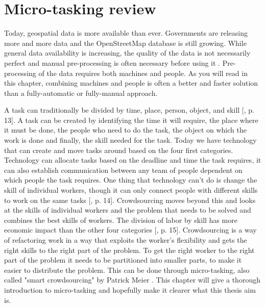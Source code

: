 \chapter{Micro-tasking review}
Today, geospatial data is more available than ever. Governments are releasing more and more data and the OpenStreetMap database is still growing. While general data availability is increasing, the quality of the data is not necessarily perfect and manual pre-processing is often necessary before using it \citep{Difallah2015}.  Pre-processing of the data requires both machines and people. As you will read in this chapter, combining machines and people is often a better and faster solution than a fully-automatic or fully-manual approach. 

A task can traditionally be divided by time, place, person, object, and skill [\citep{Meier2013}, p. 13]. A task can be created by identifying the time it will require, the place where it must be done, the people who need to do the task, the object on which the work is done and finally, the skill needed for the task. Today we have technology that can create and move tasks around based on the four first categories.  Technology can allocate tasks based on the deadline and time the task requires, it can also establish communication between any team of people dependent on which people the task requires. One thing that technology can't do is change the skill of individual workers, though it can only connect people with different skills to work on the same tasks [\citep{Meier2013}, p. 14]. Crowdsourcing moves beyond this and looks at the skills of individual workers and the problem that needs to be solved and combines the best skills of workers. The division of labor by skill has more economic impact than the other four categories [\citep{Meier2013}, p. 15]. Crowdsourcing is a way of refactoring work in a way that exploits the worker's flexibility and gets the right skills to the right part of the problem. To get the right worker to the right part of the problem it needs to be partitioned into smaller parts, to make it easier to distribute the problem. This can be done through micro-tasking, also called "smart crowdsourcing" by Patrick Meier \citep{Meier2013a}. This chapter will give a thorough introduction to micro-tasking and hopefully make it clearer what this thesis aim is. 

